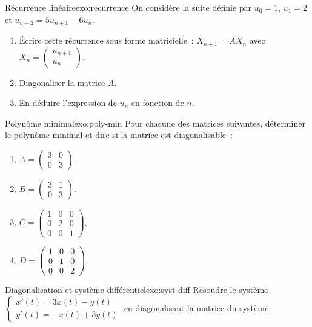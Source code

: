 \begin{exercise}{\intermediate{} Récurrence linéaire}{exo:recurrence}
  On considère la suite définie par $u_0=1$, $u_1=2$ et
  $u_{n+2}=5u_{n+1}-6u_n$.
  \begin{enumerate}[label=(\alph*)]
    \item Écrire cette récurrence sous forme matricielle~:
      $X_{n+1}=AX_n$ avec $X_n=\begin{pmatrix}u_{n+1}\\u_n\end{pmatrix}$.
    \item Diagonaliser la matrice $A$.
    \item En déduire l'expression de $u_n$ en fonction de $n$.
  \end{enumerate}
\end{exercise}

\begin{exercise}{\intermediate{} Polynôme minimal}{exo:poly-min}
  Pour chacune des matrices suivantes, déterminer le polynôme minimal
  et dire si la matrice est diagonalisable~:
  \begin{enumerate}[label=(\alph*)]
    \item $A=\begin{pmatrix}3&0\\0&3\end{pmatrix}$.
    \item $B=\begin{pmatrix}3&1\\0&3\end{pmatrix}$.
    \item $C=\begin{pmatrix}1&0&0\\0&2&0\\0&0&1\end{pmatrix}$.
    \item $D=\begin{pmatrix}1&0&0\\0&1&0\\0&0&2\end{pmatrix}$.
  \end{enumerate}
\end{exercise}

\begin{exercise}{\intermediate{} Diagonalisation et système différentiel}{exo:syst-diff}
  Résoudre le système
  $\begin{cases}x'(t)=3x(t)-y(t)\\y'(t)=-x(t)+3y(t)\end{cases}$
  en diagonalisant la matrice du système.
\end{exercise}

